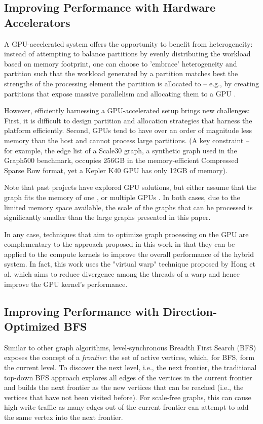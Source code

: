 \documentclass{llncs}
\begin{document}
\subsection{Improving Performance with Hardware Accelerators}\label{sec:harwareaccelerate}A GPU-accelerated system offers the opportunity to benefit from heterogeneity: instead of attempting to balance partitions by evenly distributing the workload based on memory footprint, one can choose to 'embrace' heterogeneity and partition such that the workload generated by a partition matches best the strengths of the processing element the partition is allocated to -- e.g., by creating partitions that expose massive parallelism and allocating them to a GPU \cite{gharaibeh2014efficient} \cite{cumming2014application}.

However, efficiently harnessing a GPU-accelerated setup brings new challenges: First, it is difficult to design partition and allocation strategies that harness the platform efficiently. Second, GPUs tend to have over an order of magnitude less memory than the host and cannot process large partitions. (A key constraint -- for example, the edge list of a Scale30 graph, a synthetic graph used in the Graph500 benchmark, occupies 256GB in the memory-efficient Compressed Sparse Row format, yet a Kepler K40 GPU has only 12GB of memory).

Note that past projects have explored GPU solutions, but either assume that the graph fits the memory of one \cite{hong2011accelerating} \cite{you2014designing}, or multiple GPUs \cite{merrill2012scalable}. In both cases, due to the limited memory space available, the scale of the graphs that can be processed is significantly smaller than the large graphs presented in this paper.

In any case, techniques that aim to optimize graph processing on the GPU are complementary to the approach proposed in this work in that they can be applied to the compute kernels to improve the overall performance of the hybrid system. In fact, this work uses the "virtual warp" technique proposed by Hong et al. \cite{hong2011accelerating} which aims to reduce divergence among the threads of a warp and hence improve the GPU kernel's performance.
\subsection{Improving Performance with Direction-Optimized BFS}\label{sec:dirop}Similar to other graph algorithms, level-synchronous Breadth First Search (BFS) exposes the concept of a \textit{frontier}: the set of active vertices, which, for BFS, form the current level. To discover the next level, i.e., the next frontier, the traditional top-down BFS approach explores all edges of the vertices in the  current frontier and builds the next frontier as the new vertices that can be reached (i.e., the vertices that have not been visited before). For scale-free graphs, this can cause high write traffic as many edges out of the current frontier can attempt to add the same vertex into the next frontier.
\end{document}
